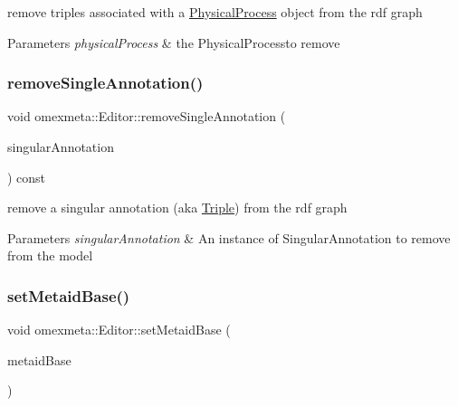 remove triples associated with a \hyperlink{classomexmeta_1_1PhysicalProcess}{Physical\+Process} object from the rdf graph 


\begin{DoxyParams}{Parameters}
{\em physical\+Process} & the Physical\+Processto remove \\
\hline
\end{DoxyParams}
\mbox{\label{classomexmeta_1_1Editor_afcb5ce7397aab23fabd3b4b4b89d3a54}} 
\subsubsection{\texorpdfstring{remove\+Single\+Annotation()}{removeSingleAnnotation()}}
{\footnotesize\ttfamily void omexmeta\+::\+Editor\+::remove\+Single\+Annotation (\begin{DoxyParamCaption}\item[{const \hyperlink{classomexmeta_1_1Triple}{Singular\+Annotation} \&}]{singular\+Annotation }\end{DoxyParamCaption}) const}



remove a singular annotation (aka \hyperlink{classomexmeta_1_1Triple}{Triple}) from the rdf graph 


\begin{DoxyParams}{Parameters}
{\em singular\+Annotation} & An instance of Singular\+Annotation to remove from the model \\
\hline
\end{DoxyParams}
\mbox{\label{classomexmeta_1_1Editor_a206feee18473abbeda5e4e55906e73eb}} 
\subsubsection{\texorpdfstring{set\+Metaid\+Base()}{setMetaidBase()}}
{\footnotesize\ttfamily void omexmeta\+::\+Editor\+::set\+Metaid\+Base (\begin{DoxyParamCaption}\item[{const std\+::string \&}]{metaid\+Base }\end{DoxyParamCaption})}




